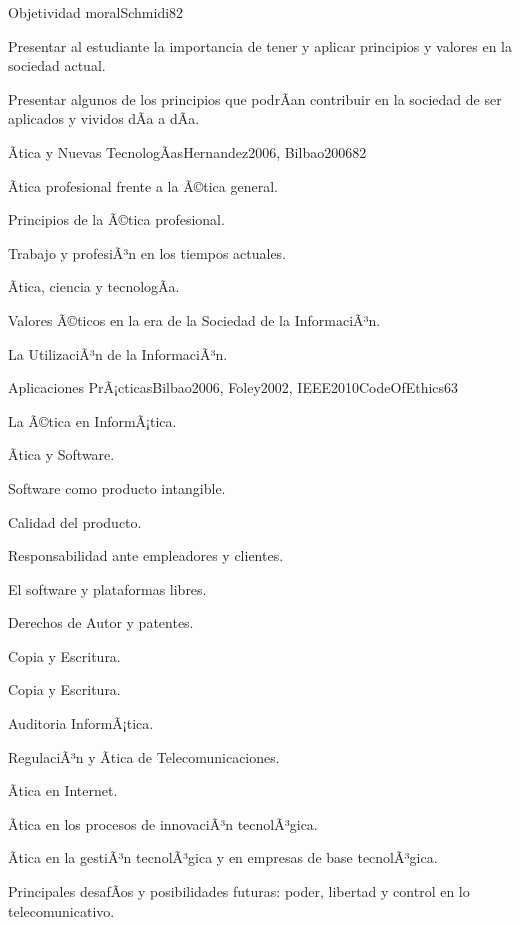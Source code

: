 \begin{syllabus}
\begin{unit}{Objetividad moral}{Schmidi}{8}{2}
\begin{unitgoals}
	\item Presentar al estudiante la importancia de tener y aplicar principios y valores en la sociedad actual.
	\item Presentar algunos de los principios que podrÃ­an contribuir en la sociedad de ser aplicados y vividos dÃ­a a dÃ­a.
\end{unitgoals}
\end{unit}

\begin{unit}{Ãtica y Nuevas TecnologÃ­as}{Hernandez2006, Bilbao2006}{8}{2}
\begin{topics}
      \item Ãtica profesional frente a la Ã©tica general.
      \item Principios de la Ã©tica profesional.
      \item Trabajo y profesiÃ³n en los tiempos actuales.
      \item Ãtica, ciencia y tecnologÃ­a.
      \item Valores Ã©ticos en la era de la Sociedad de la InformaciÃ³n.
      \item La UtilizaciÃ³n de la InformaciÃ³n.
\end{topics}
\end{unit}

\begin{unit}{Aplicaciones PrÃ¡cticas}{Bilbao2006, Foley2002, IEEE2010CodeOfEthics}{6}{3}
\begin{topics}
      \item La Ã©tica en InformÃ¡tica.
      \item Ãtica y Software.
      \item Software como producto intangible.
      \item Calidad del producto.
      \item Responsabilidad ante empleadores y clientes.
      \item El software y plataformas libres.
      \item Derechos de Autor y patentes.
      \item Copia y Escritura.
      \item Copia y Escritura.
      \item Auditoria InformÃ¡tica.
      \item RegulaciÃ³n y Ãtica de Telecomunicaciones.
      \item Ãtica en Internet.
      \item Ãtica en los procesos de innovaciÃ³n tecnolÃ³gica.
      \item Ãtica en la gestiÃ³n tecnolÃ³gica y en empresas de base tecnolÃ³gica.
      \item Principales desafÃ­os y posibilidades futuras: poder, libertad y control en lo telecomunicativo.
\end{topics}
\end{unit}



\begin{coursebibliography}
\end{coursebibliography}

\end{syllabus}
